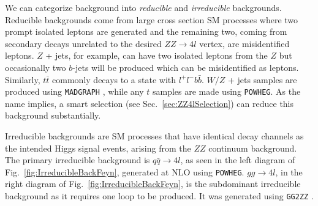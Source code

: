 We can categorize background into \textit{reducible} and \textit{irreducible} backgrounds. Reducible backgrounds come from large cross section SM processes where two prompt isolated leptons are generated and the remaining two, coming from secondary decays unrelated to the desired $ZZ\rightarrow 4l$ vertex, are misidentified leptons. $Z$ + jets, for example, can have two isolated leptons from the $Z$ but occasionally two $b$-jets will be produced which can be misidentified as leptons. Similarly, $t\bar{t}$ commonly decays to a state with $l^+l^-b\bar{b}$. $W/Z$ + jets samples are produced using {\tt MADGRAPH} \cite{}, while any $t$ samples are made using {\tt POWHEG}. As the name implies, a smart selection (see Sec.~\ref{sec:ZZ4lSelection}) can reduce this background substantially.

Irreducible backgrounds are SM processes that have identical decay channels as the intended Higgs signal events, arising from the $ZZ$ continuum background. The primary irreducible background is $q\bar{q}\rightarrow 4l$, as seen in the left diagram of Fig.~\ref{fig:IrreducibleBackFeyn}, generated at NLO using {\tt POWHEG}. $gg \rightarrow 4l$, in the right diagram of Fig.~\ref{fig:IrreducibleBackFeyn}, is the subdominant irreducible background as it requires one loop to be produced. It was generated using {\tt GG2ZZ} \cite{}.

